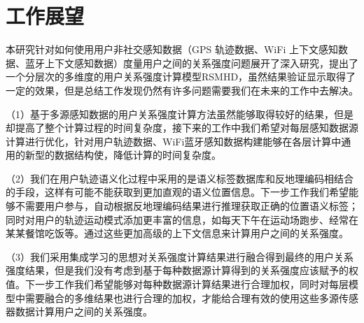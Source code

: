 \section{工作展望}
\label{sec:section6-2}
本研究针对如何使用用户非社交感知数据（GPS 轨迹数据、WiFi 上下文感知数据、蓝牙上下文感知数据）度量用户之间的关系强度问题展开了深入研究，提出了一个分层次的多维度的用户关系强度计算模型RSMHD，虽然结果验证显示取得了一定的效果，但是总结工作发现仍然有许多问题需要我们在未来的工作中去解决。
\par （1）基于多源感知数据的用户关系强度计算方法虽然能够取得较好的结果，但是却提高了整个计算过程的时间复杂度，接下来的工作中我们希望对每层感知数据源计算进行优化，针对用户轨迹数据、WiFi蓝牙感知数据构建能够在各层计算中通用的新型的数据结构使，降低计算的时间复杂度。
\par （2）我们在用户轨迹语义化过程中采用的是语义标签数据库和反地理编码相结合的手段，这样有可能不能获取到更加直观的语义位置信息。下一步工作我们希望能够不需要用户参与，自动根据反地理编码结果进行推理获取正确的位置语义标签；同时对用户的轨迹运动模式添加更丰富的信息，如每天下午在运动场跑步、经常在某某餐馆吃饭等。通过这些更加高级的上下文信息来计算用户之间的关系强度。
\par （3）我们采用集成学习的思想对关系强度计算结果进行融合得到最终的用户关系强度结果，但是我们没有考虑到基于每种数据源计算得到的关系强度应该赋予的权值。下一步工作我们希望能够对每种数据源计算结果进行合理加权，同时对每层模型中需要融合的多维结果也进行合理的加权，才能给合理有效的使用这些多源传感器数据计算用户之间的关系强度。
